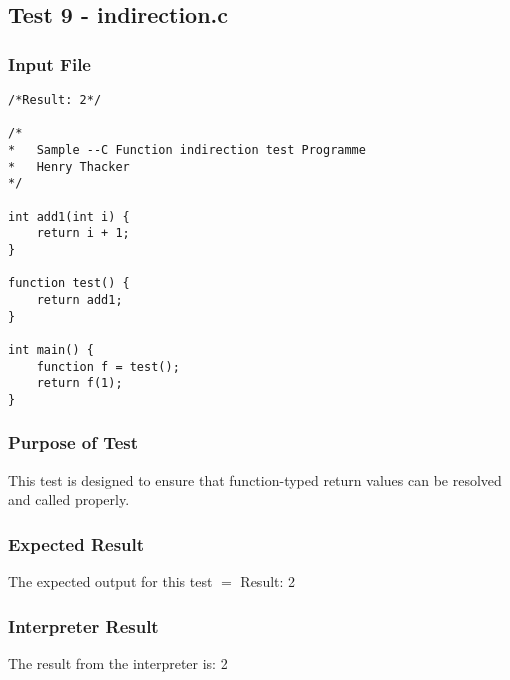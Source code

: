 \subsection{Test 9 - indirection.c}
\subsubsection{Input File}
\begin{lstlisting}[showstringspaces=false,breaklines=true,backgroundcolor=\color{light-gray}, captionpos=b]
/*Result: 2*/

/*
*	Sample --C Function indirection test Programme
*	Henry Thacker
*/

int add1(int i) {
	return i + 1;
}

function test() {
	return add1;
}

int main() {
	function f = test();
	return f(1);
}
\end{lstlisting}\subsubsection{Purpose of Test}
This test is designed to ensure that function-typed return values can be resolved and called properly.

\subsubsection{Expected Result}
The expected output for this test $=$ Result: 2
\subsubsection{Interpreter Result}
The result from the interpreter is: 2
